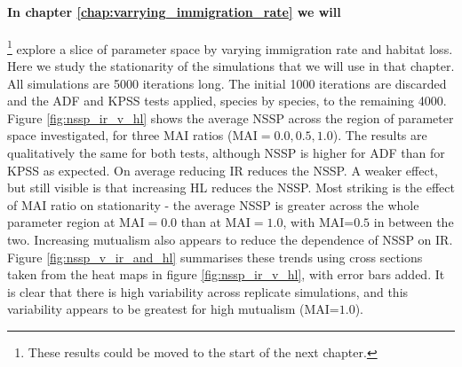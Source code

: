 \paragraph*{In chapter \ref{chap:varrying_immigration_rate} we will}\footnote{These results could be moved to the start of the next chapter.} explore a slice of parameter space by varying immigration rate and habitat loss. Here we study the stationarity of the simulations that we will use in that chapter. All simulations are 5000 iterations long. The initial 1000 iterations are discarded and the ADF and KPSS tests applied, species by species, to the remaining 4000. Figure \ref{fig:nssp_ir_v_hl} shows the average NSSP across the region of parameter space investigated, for three MAI ratios (MAI$=0.0,0.5,1.0$). The results are qualitatively the same for both tests, although NSSP is higher for ADF than for KPSS as expected. On average reducing IR reduces the NSSP. A weaker effect, but still visible is that increasing HL reduces the NSSP. Most striking is the effect of MAI ratio on stationarity - the average NSSP is greater across the whole parameter region at MAI$=0.0$ than at MAI$=1.0$, with MAI=$0.5$ in between the two. Increasing mutualism also appears to reduce the dependence of NSSP on IR.  Figure \ref{fig:nssp_v_ir_and_hl} summarises these trends using cross sections taken from the heat maps in figure \ref{fig:nssp_ir_v_hl}, with error bars added. It is clear that there is high variability across replicate simulations, and this variability appears to be greatest for high mutualism (MAI=$1.0$).

